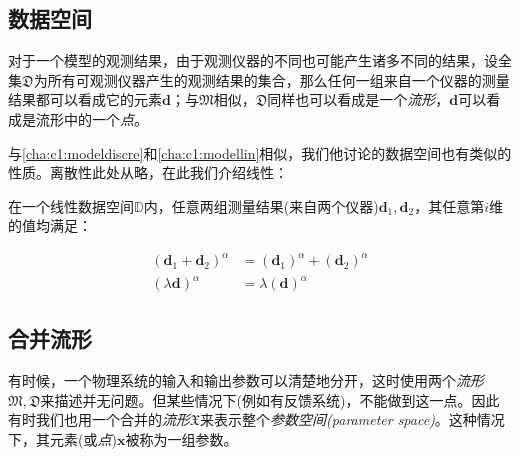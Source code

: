 \subsection{数据空间}

对于一个模型的观测结果，由于观测仪器的不同也可能产生诸多不同的结果，设全集$\mathfrak{D}$为所有可观测仪器产生的观测结果的集合，那么任何一组来自一个仪器的测量结果都可以看成它的元素$\mathbf{d}$；与$\mathfrak{M}$相似，$\mathfrak{D}$同样也可以看成是一个\emph{流形}，$\mathbf{d}$可以看成是流形中的一个\emph{点}。

与\autoref{cha:c1:modeldiscre}和\autoref{cha:c1:modellin}相似，我们他讨论的数据空间也有类似的性质。离散性此处从略，在此我们介绍线性：

\begin{character}[线性] \label{cha:c1:datalin}
  
  在一个线性数据空间$\mathbb{D}$内，任意两组测量结果(来自两个仪器)$\mathbf{d}_1,\mathbf{d}_2$，其任意第$i$维的值均满足：
  
  \begin{align} 
    (\mathbf{d}_1+\mathbf{d}_2)^{\alpha} &= (\mathbf{d}_1)^{\alpha} + (\mathbf{d}_2)^{\alpha} \label{fml:c1:datalinearity1} \\
    (\lambda \mathbf{d})^{\alpha} &= \lambda(\mathbf{d})^{\alpha}\label{fml:c1:datalinearity2}
  \end{align}
  
\end{character}

\subsection{合并流形}

有时候，一个物理系统的输入和输出参数可以清楚地分开，这时使用两个\emph{流形}~$\mathfrak{M},\mathfrak{D}$来描述并无问题。但某些情况下(例如有反馈系统)，不能做到这一点。因此有时我们也用一个合并的\emph{流形}$\mathfrak{X}$来表示整个\emph{参数空间(parameter space)}。这种情况下，其元素(或\emph{点})$\mathbf{x}$被称为一组参数。